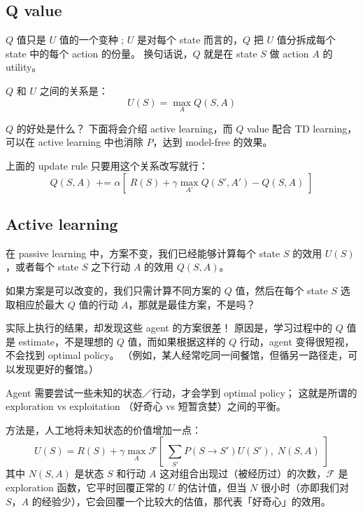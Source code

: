 \subsection{Q value}

$Q$ 值只是 $U$ 值的一个变种 ;   $U$ 是对每个 state 而言的，$Q$ 把 $U$ 值分拆成每个 state 中的每个 action 的份量。  换句话说，$Q$ 就是在 state $S$ 做 action $A$ 的 utility。

$Q$ 和 $U$ 之间的关系是：
$$ U(S) = \max_A  Q(S, A) $$

$Q$ 的好处是什么？  下面将会介绍 active learning，而 $Q$ value  配合 TD learning，可以在 active learning 中也消除 $P$，达到 model-free 的效果。

上面的 update rule 只要用这个关系改写就行：
$$ Q(S, A) \mbox{  +=  } \alpha [ \; R(S) + \gamma \max_{A'}  Q(S', A') - Q(S, A) \; ] $$

\subsection{Active learning}

在 passive learning 中，方案不变，我们已经能够计算每个 state $S$ 的效用 $U(S)$，或者每个 state $S$ 之下行动 $A$ 的效用 $Q(S, A)$。

如果方案是可以改变的，我们只需计算不同方案的 $Q$ 值，然后在每个 state $S$ 选取相应於最大 $Q$ 值的行动 $A$，那就是最佳方案，不是吗？

实际上执行的结果，却发现这些 agent 的方案很差！  原因是，学习过程中的 $Q$ 值是 estimate，不是理想的 $Q$ 值，而如果根据这样的 $Q$ 行动，agent 变得很短视，不会找到 optimal policy。  （例如，某人经常吃同一间餐馆，但循另一路径走，可以发现更好的餐馆。）

Agent 需要尝试一些未知的状态／行动，才会学到 optimal policy；  这就是所谓的 exploration vs exploitation （好奇心 vs 短暂贪婪）之间的平衡。

方法是，人工地将未知状态的价值增加一点：
$$ U(S) = R(S) + \gamma \max_A \mathcal{F}[ \; \sum_{S'} P(S \rightarrow S') U(S'), \; N(S, A) \; ] $$
其中 $N(S, A)$ 是状态 $S$ 和行动 $A$ 这对组合出现过（被经历过）的次数，$\mathcal{F}$ 是 exploration 函数，它平时回覆正常的 $U$ 的估计值，但当 $N$ 很小时（亦即我们对 $S$，$A$ 的经验少），它会回覆一个比较大的估值，那代表「好奇心」的效用。





